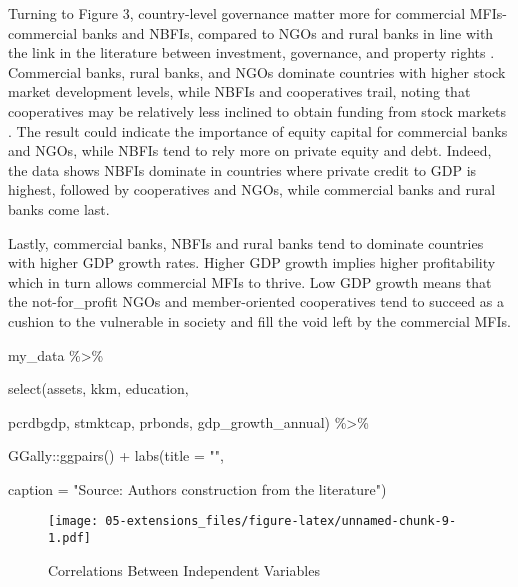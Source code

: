 \documentclass[a4paper,nobind]{templates/ociamthesis}
\newenvironment{Shaded}{\begin{snugshade}}{\end{snugshade}}
\newcommand{\AttributeTok}[1]{\textcolor[rgb]{0.77,0.63,0.00}{#1}}
\newcommand{\FunctionTok}[1]{\textcolor[rgb]{0.00,0.00,0.00}{#1}}
\newcommand{\NormalTok}[1]{#1}
\newcommand{\SpecialCharTok}[1]{\textcolor[rgb]{0.00,0.00,0.00}{#1}}
\newcommand{\StringTok}[1]{\textcolor[rgb]{0.31,0.60,0.02}{#1}}
\renewenvironment{Shaded}
{
  \vspace{10pt}%
  \begin{snugshade}%
}{%
  \end{snugshade}%
  \vspace{8pt}%
}
\begin{document}
Turning to Figure 3, country-level governance matter more for commercial MFIs- commercial banks and NBFIs, compared to NGOs and rural banks in line with the link in the literature between investment, governance, and property rights \autocite{claessens2003financial}. Commercial banks, rural banks, and NGOs dominate countries with higher stock market development levels, while NBFIs and cooperatives trail, noting that cooperatives may be relatively less inclined to obtain funding from stock markets \autocite{porter1987economic}. The result could indicate the importance of equity capital for commercial banks and NGOs, while NBFIs tend to rely more on private equity and debt. Indeed, the data shows NBFIs dominate in countries where private credit to GDP is highest, followed by cooperatives and NGOs, while commercial banks and rural banks come last.

Lastly, commercial banks, NBFIs and rural banks tend to dominate countries with higher GDP growth rates. Higher GDP growth implies higher profitability which in turn allows commercial MFIs to thrive. Low GDP growth means that the not-for\_profit NGOs and member-oriented cooperatives tend to succeed as a cushion to the vulnerable in society and fill the void left by the commercial MFIs.

\newpage

\blandscape

\begin{Shaded}
\begin{Highlighting}[]
\NormalTok{my\_data }\SpecialCharTok{\%\textgreater{}\%}
  
  \FunctionTok{select}\NormalTok{(assets, kkm, education, }
         
\NormalTok{         pcrdbgdp, stmktcap, prbonds, gdp\_growth\_annual) }\SpecialCharTok{\%\textgreater{}\%} 
  
\NormalTok{         GGally}\SpecialCharTok{::}\FunctionTok{ggpairs}\NormalTok{() }\SpecialCharTok{+} \FunctionTok{labs}\NormalTok{(}\AttributeTok{title =} \StringTok{""}\NormalTok{, }
                                  
                                  \AttributeTok{caption =} \StringTok{"Source: Authors\textquotesingle{} construction from the literature"}\NormalTok{)}
\end{Highlighting}
\end{Shaded}

\begin{figure}
\centering
\texttt{[image: 05-extensions\_files/figure-latex/unnamed-chunk-9-1.pdf]}
\caption{\label{fig:unnamed-chunk-9}Correlations Between Independent Variables}
\end{figure}
\end{document}

